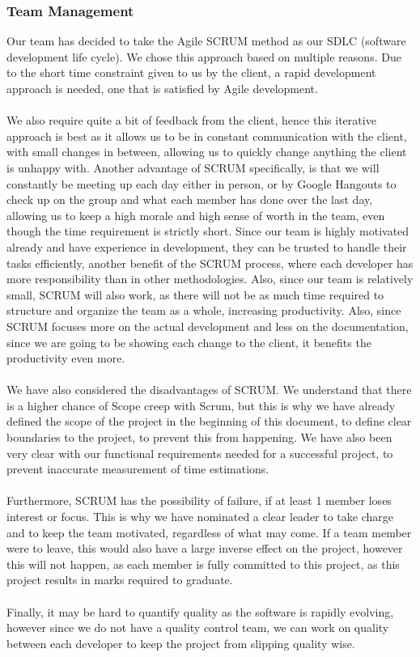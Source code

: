 \documentclass[a4paper,12pt]{article}
\begin{document}
\subsubsection{Team Management}
Our team has decided to take the Agile SCRUM method as our SDLC (software development life cycle). We chose this approach based on multiple reasons. Due to the short time constraint given to us by the client, a rapid development approach is needed, one that is satisfied by Agile development.\\\\ We also require quite a bit of feedback from the client, hence this iterative approach is best as it allows us to be in constant communication with the client, with small changes in between, allowing us to quickly change anything the client is unhappy with. Another advantage of SCRUM specifically, is that we will constantly be meeting up each day either in person, or by Google Hangouts to check up on the group and what each member has done over the last day, allowing us to keep a high morale and high sense of worth in the team, even though the time requirement is strictly short. Since our team is highly motivated already and have experience in development, they can be trusted to handle their tasks efficiently, another benefit of the SCRUM process, where each developer has more responsibility than in other methodologies. Also, since our team is relatively small, SCRUM will also work, as there will not be as much time required to structure and organize the team as a whole, increasing productivity. Also, since SCRUM focuses more on the actual development and less on the documentation, since we are going to be showing each change to the client, it benefits the productivity even more.
\\\\We have also considered the disadvantages of SCRUM. We understand that there is a higher chance of Scope creep with Scrum, but this is why we have already defined the scope of the project in the beginning of this document, to define clear boundaries to the project, to prevent this from happening. We have also been very clear with our functional requirements needed for a successful project, to prevent inaccurate measurement of time estimations.\\\\ Furthermore, SCRUM has the possibility of failure, if at least 1 member loses interest or focus. This is why we have nominated a clear leader to take charge and to keep the team motivated, regardless of what may come. If a team member were to leave, this would also have a large inverse effect on the project, however this will not happen, as each member is fully committed to this project, as this project results in marks required to graduate. \\\\Finally, it may be hard to quantify quality as the software is rapidly evolving, however since we do not have a quality control team, we can work on quality between each developer to keep the project from slipping quality wise.
\end{document}
